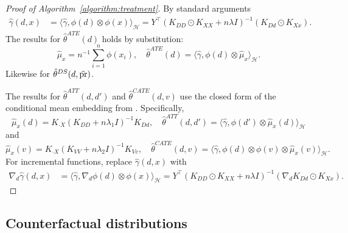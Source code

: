 \begin{proof}[Proof of Algorithm~\ref{algorithm:treatment}]
By standard arguments \cite{kimeldorf1971some}
\begin{align*}
\hat{\gamma}(d,x)&=
\langle \hat{\gamma}, \phi(d)\otimes \phi(x) \rangle_{\mathcal{H}}=Y^{\top}(K_{DD}\odot K_{XX}+n\lambda  I )^{-1}(K_{Dd}\odot K_{Xx}).    
\end{align*}
    The results for $\hat{\theta}^{ATE}(d)$ holds by substitution:
   $$
   \hat{\mu}_x=n^{-1}\sum_{i=1}^n \phi(x_i),\quad \hat{\theta}^{ATE}(d)=\langle \hat{\gamma}, \phi(d)\otimes \hat{\mu}_x\rangle_{\mathcal{H}}.
   $$
    Likewise for $\hat{\theta}^{DS}(d,\tilde{\text{\normalfont pr}})$. 
    
    The results for $\hat{\theta}^{ATT}(d,d')$ and $\hat{\theta}^{CATE}(d,v)$ use the closed form of the conditional mean embedding from \cite[Algorithm 1]{singh2019kernel}. Specifically,
    $$
    \hat{\mu}_x(d)=K_{\cdot X}(K_{DD}+n\lambda_1 I )^{-1}K_{Dd},\quad  \hat{\theta}^{ATT}(d,d')=\langle \hat{\gamma}, \phi(d')\otimes \hat{\mu}_x(d)\rangle_{\mathcal{H}} 
    $$
and
    $$
    \hat{\mu}_{x}(v)=K_{\cdot X}(K_{VV}+n\lambda_2 I )^{-1}K_{Vv},\quad \hat{\theta}^{CATE}(d,v)=\langle \hat{\gamma}, \phi(d)\otimes \phi(v)\otimes \hat{\mu}_{x}(v)\rangle_{\mathcal{H}}.
    $$
For incremental functions, replace $\hat{\gamma}(d,x)$ with
\begin{align*}
\nabla_d\hat{\gamma}(d,x)&=
\langle \hat{\gamma}, \nabla_d \phi(d)\otimes \phi(x) \rangle_{\mathcal{H}}=Y^{\top}(K_{DD}\odot K_{XX}+n\lambda I )^{-1}(\nabla_d K_{Dd}\odot K_{Xx}).
\end{align*}
\end{proof}

\subsection{Counterfactual distributions}

